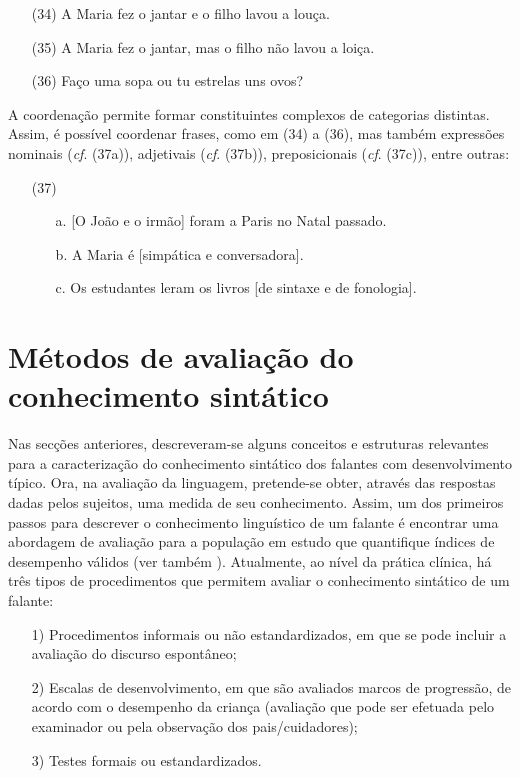 \documentclass[output=paper,colorlinks,citecolor=brown,booklanguage=portuguese]{langscibook}
\begin{document}
\begin{enumerate}[align=left]
    \item [(34)] A Maria fez o jantar e o filho lavou a louça.
\item[(35)] A Maria fez o jantar, mas o filho não lavou a loiça.
\item[(36)] Faço uma sopa ou tu estrelas uns ovos?
\end{enumerate}

A coordenação permite formar constituintes complexos de categorias distintas. Assim, é possível coordenar frases, como em (34) a (36), mas também expressões nominais (\emph{cf}. (37a)), adjetivais (\emph{cf}. (37b)), preposicionais (\emph{cf}. (37c)), entre outras:

\begin{enumerate}[align=left]
    \item [(37)]
    \begin{enumerate}
        \item [a.][O João e o irmão] foram a Paris no Natal passado.
	\item[b.] A Maria é [simpática e conversadora].
	\item[c.] Os estudantes leram os livros [de sintaxe e de fonologia].
    \end{enumerate}
\end{enumerate}

\section{Métodos de avaliação do conhecimento sintático}
Nas secções anteriores, descreveram-se alguns conceitos e estruturas relevantes para a caracterização do conhecimento sintático dos falantes com desenvolvimento típico. Ora, na avaliação da linguagem, pretende-se obter, através das respostas dadas pelos sujeitos, uma medida de seu conhecimento. Assim, um dos primeiros passos para descrever o conhecimento linguístico de um falante é encontrar uma abordagem de avaliação para a população em estudo que quantifique índices de desempenho válidos (ver também ). Atualmente, ao nível da prática clínica, há três tipos de procedimentos que permitem avaliar o conhecimento sintático de um falante:

\begin{enumerate}[align=left]
\item[1)] Procedimentos informais ou não estandardizados, em que se pode incluir a avaliação do discurso espontâneo;
\item[2)] Escalas de desenvolvimento, em que são avaliados marcos de progressão, de acordo com o desempenho da criança (avaliação que pode ser efetuada pelo examinador ou pela observação dos pais/cuidadores);
\item[3)] Testes formais ou estandardizados.
\end{enumerate}
\end{document}
